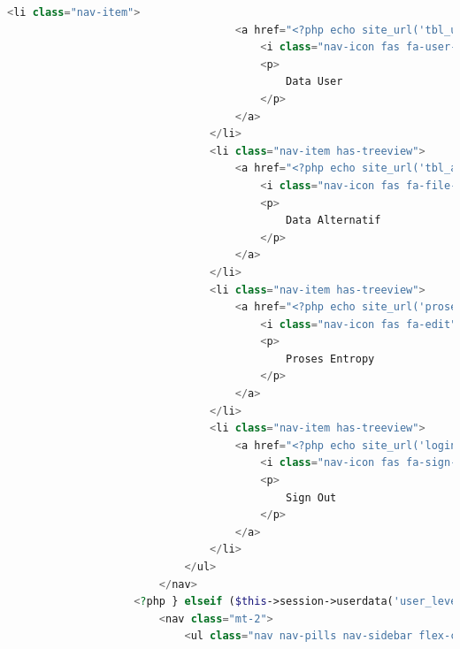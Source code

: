 \begin{lstlisting}[language=PHP]
	                            <li class="nav-item">  
	                                <a href="<?php echo site_url('tbl_user'); ?>" class="nav-link">  
	                                    <i class="nav-icon fas fa-user-circle"></i>  
	                                    <p>  
	                                        Data User  
	                                    </p>  
	                                </a>  
	                            </li>  
	                            <li class="nav-item has-treeview">  
	                                <a href="<?php echo site_url('tbl_alternatif'); ?>" class="nav-link">  
	                                    <i class="nav-icon fas fa-file-alt"></i>  
	                                    <p>  
	                                        Data Alternatif  
	                                    </p>  
	                                </a>  
	                            </li>  
	                            <li class="nav-item has-treeview">  
	                                <a href="<?php echo site_url('proses_entropy'); ?>" class="nav-link">  
	                                    <i class="nav-icon fas fa-edit"></i>  
	                                    <p>  
	                                        Proses Entropy  
	                                    </p>  
	                                </a>  
	                            </li>  
	                            <li class="nav-item has-treeview">  
	                                <a href="<?php echo site_url('login/logout'); ?>" class="nav-link">  
	                                    <i class="nav-icon fas fa-sign-out-alt"></i>  
	                                    <p>  
	                                        Sign Out  
	                                    </p>  
	                                </a>  
	                            </li>  
	                        </ul>  
	                    </nav>  
	                <?php } elseif ($this->session->userdata('user_level') === 'user') { ?>  
	                    <nav class="mt-2">  
	                        <ul class="nav nav-pills nav-sidebar flex-column" data-widget="treeview" role="menu" data-accordion="false">  
  

\end{lstlisting}
